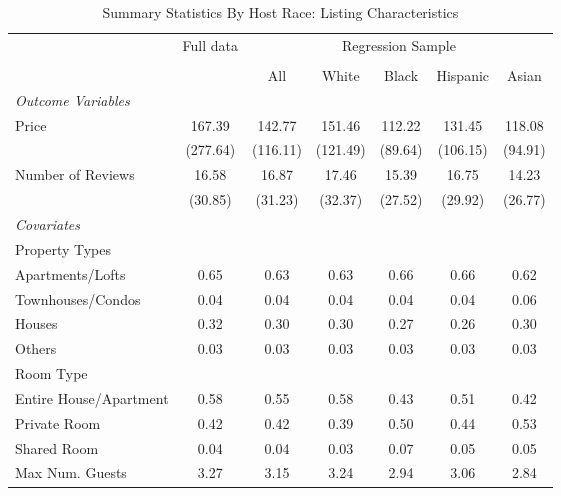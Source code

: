 \begin{table}[htbp]
\caption{Summary Statistics By Host Race: Listing Characteristics}
\begin{center}%
\small\begin{tabular}{l c | c | c c c c}
& \multicolumn{1}{c}{Full data} & \multicolumn{5}{c}{Regression Sample}
\\
 \cmidrule(r){3-7}
\\
 & \multicolumn{1}{c}{} & \multicolumn{1}{c}{All} & White & Black & Hispanic & Asian
\\
\hline\hline\noalign{\smallskip} 
 \textit{\textit{Outcome Variables}} & & & & & & \\ Price & 167.39 & 142.77 & 151.46 & 112.22 & 131.45 & 118.08 \\
 & (277.64) & (116.11) & (121.49) & (89.64) & (106.15) & (94.91) \\
 Number of Reviews & 16.58 & 16.87 & 17.46 & 15.39 & 16.75 & 14.23 \\
 & (30.85) & (31.23) & (32.37) & (27.52) & (29.92) & (26.77) \\
 \textit{Covariates} & & & & & & \\ \hline Property Types & & & & & & \\ \hspace{10bp}Apartments/Lofts    & 0.65 & 0.63 & 0.63 & 0.66 & 0.66 & 0.62 \\ \hspace{10bp}Townhouses/Condos   & 0.04 & 0.04 & 0.04 & 0.04 & 0.04 & 0.06 \\ \hspace{10bp}Houses                      & 0.32 & 0.30 & 0.30 & 0.27 & 0.26 & 0.30 \\ \hspace{10bp}Others                              & 0.03 & 0.03 & 0.03 & 0.03 & 0.03 & 0.03 \\Room Type &&&&&& \\ \hspace{10bp}Entire House/Apartment      & 0.58 & 0.55 & 0.58 & 0.43 & 0.51 & 0.42 \\ \hspace{10bp}Private Room                        & 0.42 & 0.42 & 0.39 & 0.50 & 0.44 & 0.53 \\ \hspace{10bp}Shared Room                         & 0.04 & 0.04 & 0.03 & 0.07 & 0.05 & 0.05 \\ Max Num. Guests & 3.27 & 3.15 & 3.24 & 2.94 & 3.06 & 2.84 \\

\end{tabular}
\end{center}
\end{table}
